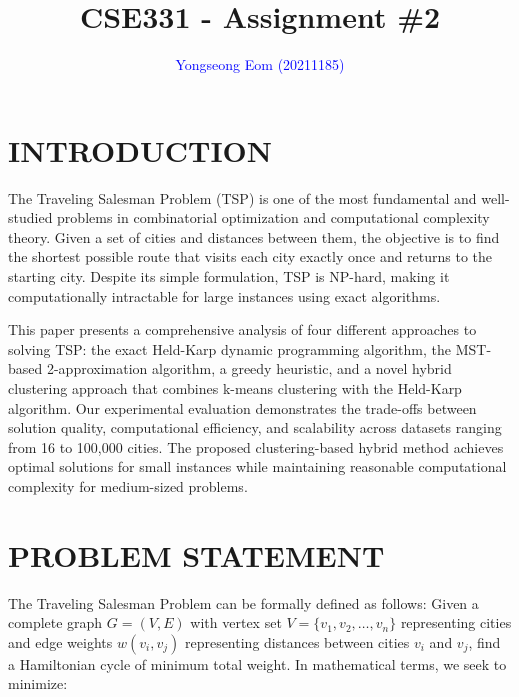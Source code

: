 \documentclass[sigconf]{acmart}
\begin{document}
\title{CSE331 - Assignment \#2}

\author{\textcolor{blue}{Yongseong Eom (20211185)}}

\renewcommand{\shortauthors}{\textcolor{blue}{Eom et al.}}



\renewcommand\footnotetextcopyrightpermission[1]{} %



\maketitle


\section{INTRODUCTION}

The Traveling Salesman Problem (TSP) is one of the most fundamental and well-studied problems in combinatorial optimization and computational complexity theory. Given a set of cities and distances between them, the objective is to find the shortest possible route that visits each city exactly once and returns to the starting city. Despite its simple formulation, TSP is NP-hard, making it computationally intractable for large instances using exact algorithms.

This paper presents a comprehensive analysis of four different approaches to solving TSP: the exact Held-Karp dynamic programming algorithm, the MST-based 2-approximation algorithm, a greedy heuristic, and a novel hybrid clustering approach that combines k-means clustering with the Held-Karp algorithm. Our experimental evaluation demonstrates the trade-offs between solution quality, computational efficiency, and scalability across datasets ranging from 16 to 100,000 cities. The proposed clustering-based hybrid method achieves optimal solutions for small instances while maintaining reasonable computational complexity for medium-sized problems.

\section{PROBLEM STATEMENT}

The Traveling Salesman Problem can be formally defined as follows: Given a complete graph $G = (V, E)$ with vertex set $V = \{v_1, v_2, \ldots, v_n\}$ representing cities and edge weights $w(v_i, v_j)$ representing distances between cities $v_i$ and $v_j$, find a Hamiltonian cycle of minimum total weight. In mathematical terms, we seek to minimize:
\end{document}
